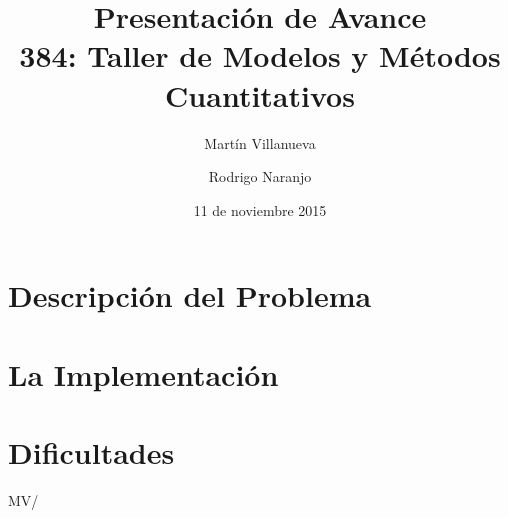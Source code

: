 \documentclass[spanish, fleqn]{article}
\title{Presentación de Avance \\384: Taller de Modelos y Métodos Cuantitativos}
\author{Martín Villanueva \and Rodrigo Naranjo}
\date{11 de noviembre 2015}
\begin{document}
\maketitle

\thispagestyle{empty}


\section{Descripción del Problema}



\section{La Implementación}

 

\section{Dificultades}


  



\vfill\hfill MV/\LaTeXe
\end{document}

